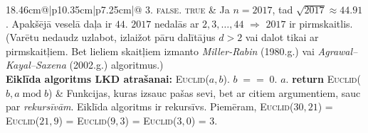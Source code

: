 \documentclass[a4paper]{article}
\begin{document}
\begin{table}[ht!]
{\begin{tabular*}{18.46cm}{@{}|p{10.35cm}|p{7.25cm}|@{}}
3.\hspace{1em}\hspace{2em}\hspace{2em}{\bf return} {\scshape false}.\hspace{1em}{\bf return} {\scshape true} &
Ja $n=2017$, tad $\sqrt{2017} \approx 44.91$. Apakšējā veselā daļa ir $44$.
$2017$ nedalās ar $2,3,\ldots,44$ $\Rightarrow$ $2017$ ir pirmskaitlis.
(Varētu nedaudz uzlabot, izlaižot pāru dalītājus $d>2$ vai dalot tikai ar pirmskaitļiem. 
Bet lieliem skaitļiem izmanto {\em Miller-Rabin} (1980.g.)
vai {\em Agrawal–Kayal–Saxena} (2002.g.) algoritmus.) \\ \hline 
{\bf Eiklīda algoritms LKD atrašanai:}\newline
{\scshape Euclid}($a,b$).\hspace{1em}{\bf if} $b\;==\;0$.\hspace{1em}\hspace{2em}{\bf return} $a$.\hspace{1em}{\bf else} {\bf return} {\scshape Euclid}($b, a\;\mbox{mod}\;b$) &
Funkcijas, kuras izsauc pašas sevi, bet ar citiem argumentiem, sauc par {\em rekursīvām}. Eiklīda
algoritms ir rekursīvs. Piemēram, {\scshape Euclid}($30,21$) =
{\scshape Euclid}($21,9$) = {\scshape Euclid}($9,3$) = {\scshape Euclid}($3,0$) = 3. \\ \hline
{} \\ \hline
{}
\end{tabular*}}
\end{table}
\end{document}
